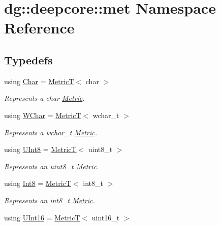 \hypertarget{namespacedg_1_1deepcore_1_1met}{}\section{dg\+:\+:deepcore\+:\+:met Namespace Reference}
\label{namespacedg_1_1deepcore_1_1met}
\subsection*{Typedefs}
\begin{DoxyCompactItemize}
\item 
using \hyperlink{group___process_metrics_ga3689c12dcf2ea830e912ac1dc4c504ce}{Char} = \hyperlink{structdg_1_1deepcore_1_1_metric_t}{MetricT}$<$ char $>$
\begin{DoxyCompactList}\small\item\em Represents a {\ttfamily char} \hyperlink{classdg_1_1deepcore_1_1_metric}{Metric}. \end{DoxyCompactList}\item 
using \hyperlink{group___process_metrics_ga1b9b88b573ba6176c03d75acb590e962}{W\+Char} = \hyperlink{structdg_1_1deepcore_1_1_metric_t}{MetricT}$<$ wchar\+\_\+t $>$
\begin{DoxyCompactList}\small\item\em Represents a {\ttfamily wchar\+\_\+t} \hyperlink{classdg_1_1deepcore_1_1_metric}{Metric}. \end{DoxyCompactList}\item 
using \hyperlink{group___process_metrics_ga17ad9985c2ab7f5e45d50cdcac20b857}{U\+Int8} = \hyperlink{structdg_1_1deepcore_1_1_metric_t}{MetricT}$<$ uint8\+\_\+t $>$
\begin{DoxyCompactList}\small\item\em Represents an {\ttfamily uint8\+\_\+t} \hyperlink{classdg_1_1deepcore_1_1_metric}{Metric}. \end{DoxyCompactList}\item 
using \hyperlink{group___process_metrics_gaa1a7c0e8050673a6327d8856f334ec10}{Int8} = \hyperlink{structdg_1_1deepcore_1_1_metric_t}{MetricT}$<$ int8\+\_\+t $>$
\begin{DoxyCompactList}\small\item\em Represents an {\ttfamily int8\+\_\+t} \hyperlink{classdg_1_1deepcore_1_1_metric}{Metric}. \end{DoxyCompactList}\item 
using \hyperlink{group___process_metrics_ga234f31e63c02211edabdbc7423c4e0ab}{U\+Int16} = \hyperlink{structdg_1_1deepcore_1_1_metric_t}{MetricT}$<$ uint16\+\_\+t $>$

\end{DoxyCompactItemize}
